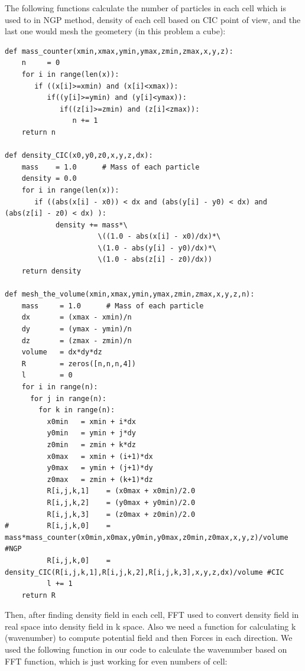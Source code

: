 \documentclass[10pt]{article}
\begin{document}
The following functions calculate the number of particles in each cell which is used to in NGP method, density of each cell based on CIC point of view, and the last one would mesh the geometery (in this problem a cube): \\

\begin{verbatim}
def mass_counter(xmin,xmax,ymin,ymax,zmin,zmax,x,y,z):
    n     = 0
    for i in range(len(x)):
       if ((x[i]>=xmin) and (x[i]<xmax)):
          if((y[i]>=ymin) and (y[i]<ymax)):
             if((z[i]>=zmin) and (z[i]<zmax)):
                n += 1
    return n

def density_CIC(x0,y0,z0,x,y,z,dx):
    mass    = 1.0      # Mass of each particle
    density = 0.0
    for i in range(len(x)):
       if ((abs(x[i] - x0)) < dx and (abs(y[i] - y0) < dx) and (abs(z[i] - z0) < dx) ):
            density += mass*\
                      \((1.0 - abs(x[i] - x0)/dx)*\
                      \(1.0 - abs(y[i] - y0)/dx)*\
                      \(1.0 - abs(z[i] - z0)/dx))
    return density

def mesh_the_volume(xmin,xmax,ymin,ymax,zmin,zmax,x,y,z,n):
    mass     = 1.0      # Mass of each particle
    dx       = (xmax - xmin)/n
    dy       = (ymax - ymin)/n
    dz       = (zmax - zmin)/n
    volume   = dx*dy*dz
    R        = zeros([n,n,n,4])
    l        = 0
    for i in range(n):
      for j in range(n):
        for k in range(n):
          x0min   = xmin + i*dx
          y0min   = ymin + j*dy
          z0min   = zmin + k*dz
          x0max   = xmin + (i+1)*dx
          y0max   = ymin + (j+1)*dy
          z0max   = zmin + (k+1)*dz
          R[i,j,k,1]    = (x0max + x0min)/2.0
          R[i,j,k,2]    = (y0max + y0min)/2.0
          R[i,j,k,3]    = (z0max + z0min)/2.0
#         R[i,j,k,0]    = mass*mass_counter(x0min,x0max,y0min,y0max,z0min,z0max,x,y,z)/volume #NGP
          R[i,j,k,0]    = density_CIC(R[i,j,k,1],R[i,j,k,2],R[i,j,k,3],x,y,z,dx)/volume #CIC
          l += 1
    return R 
\end{verbatim}

Then, after finding density field in each cell, FFT used to convert density field in real space into density field in k space. Also we need a function for calculating k (wavenumber) to compute potential field and then Forces in each direction. We used the following function in our code to calculate the wavenumber based on FFT function, which is just working for 
even numbers of cell: \\
\end{document}
